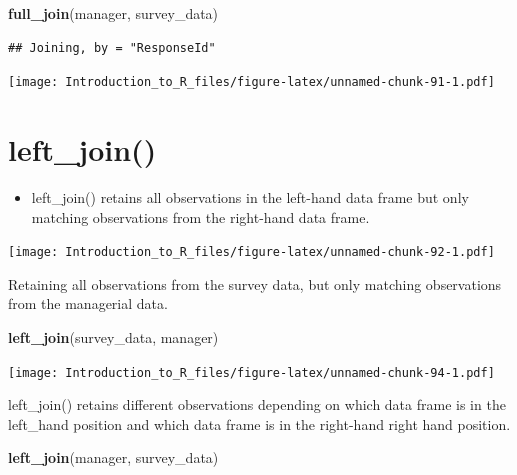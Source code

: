 \documentclass[]{book}
\newenvironment{Shaded}{\begin{snugshade}}{\end{snugshade}}
\newcommand{\KeywordTok}[1]{\textcolor[rgb]{0.13,0.29,0.53}{\textbf{#1}}}
\newcommand{\NormalTok}[1]{#1}
\providecommand{\tightlist}{%
  \setlength{\itemsep}{0pt}\setlength{\parskip}{0pt}}
\theoremstyle{definition}
\theoremstyle{definition}
\theoremstyle{definition}
\theoremstyle{remark}
\let\BeginKnitrBlock\begin \let\EndKnitrBlock\end
\begin{document}
\begin{Shaded}
\begin{Highlighting}[]
\KeywordTok{full_join}\NormalTok{(manager, survey_data)}
\end{Highlighting}
\end{Shaded}

\begin{verbatim}
## Joining, by = "ResponseId"
\end{verbatim}

\texttt{[image: Introduction\_to\_R\_files/figure-latex/unnamed-chunk-91-1.pdf]}

\hypertarget{left}{%
\section{left\_join()}\label{left}}

\begin{itemize}
\tightlist
\item
  left\_join() retains all observations in the left-hand data frame but only matching observations from the right-hand data frame.
\end{itemize}

\texttt{[image: Introduction\_to\_R\_files/figure-latex/unnamed-chunk-92-1.pdf]}

\BeginKnitrBlock{example}
\protect\hypertarget{exm:leftjoin1}{}{\label{exm:leftjoin1} }Retaining all observations from the survey data, but only matching observations from the managerial data.
\EndKnitrBlock{example}

\begin{Shaded}
\begin{Highlighting}[]
\KeywordTok{left_join}\NormalTok{(survey_data, manager)}
\end{Highlighting}
\end{Shaded}

\texttt{[image: Introduction\_to\_R\_files/figure-latex/unnamed-chunk-94-1.pdf]}

\BeginKnitrBlock{example}
\protect\hypertarget{exm:leftjoin2}{}{\label{exm:leftjoin2} }left\_join() retains different observations depending on which data frame is in the left\_hand position and which data frame is in the right-hand right hand position.
\EndKnitrBlock{example}

\begin{Shaded}
\begin{Highlighting}[]
\KeywordTok{left_join}\NormalTok{(manager, survey_data)}
\end{Highlighting}
\end{Shaded}
\end{document}
